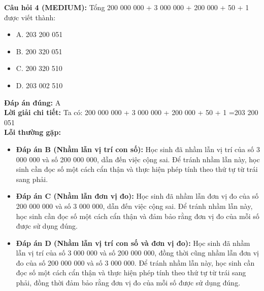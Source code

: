 \documentclass{article}
\begin{document}
\begin{minipage}{\textwidth}
\noindent\textbf{Câu hỏi 4 (MEDIUM):} Tổng 200 000 000 + 3 000 000 + 200 000 + 50 + 1 được viết thành: 
\begin{itemize}[label={}]
    \item A. 203 200 051
    \item B. 200 320 051
    \item C. 200 320 510
    \item D. 203 002 510
\end{itemize}
\textbf{Đáp án đúng:} A \\
\textbf{Lời giải chi tiết:} Ta có: 200 000 000 + 3 000 000 + 200 000 + 50 + 1 =203 200 051 \\
\textbf{Lỗi thường gặp:}
\begin{itemize}
  \item \textbf{Đáp án B (Nhầm lẫn vị trí con số):} Học sinh đã nhầm lẫn vị trí của số 3 000 000 và số 200 000 000, dẫn đến việc cộng sai. Để tránh nhầm lẫn này, học sinh cần đọc số một cách cẩn thận và thực hiện phép tính theo thứ tự từ trái sang phải.
  \item \textbf{Đáp án C (Nhầm lẫn đơn vị đo):} Học sinh đã nhầm lẫn đơn vị đo của số 200 000 000 và số 3 000 000, dẫn đến việc cộng sai. Để tránh nhầm lẫn này, học sinh cần đọc số một cách cẩn thận và đảm bảo rằng đơn vị đo của mỗi số được sử dụng đúng.
  \item \textbf{Đáp án D (Nhầm lẫn vị trí con số và đơn vị đo):} Học sinh đã nhầm lẫn vị trí của số 3 000 000 và số 200 000 000, đồng thời cũng nhầm lẫn đơn vị đo của số 200 000 000 và số 3 000 000. Để tránh nhầm lẫn này, học sinh cần đọc số một cách cẩn thận và thực hiện phép tính theo thứ tự từ trái sang phải, đồng thời đảm bảo rằng đơn vị đo của mỗi số được sử dụng đúng.
\end{itemize}
\end{minipage}
\vspace{1em}
\end{document}
